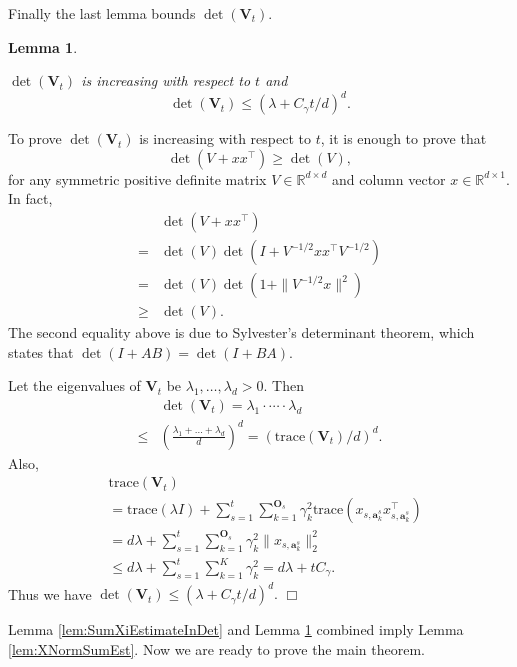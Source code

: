 \documentclass{article}
\newcommand{\RR}{\mathbb{R}}
\newcommand{\ba}{\mathbf{a}}
\newcommand{\bO}{\mathbf{O}}
\newcommand{\bV}{\mathbf{V}}
\newcommand{\trace}{\mathrm{trace}}
\newcommand{\norm}[1]{\| #1 \|}
\newtheorem{lemma}[theorem]{Lemma}%
\newenvironment{proof}{\noindent {\textbf{Proof. }}}{$\Box$ \medskip}
\newcommand{\CLemmaDetVt}{
  $\det(\bV_t)$ is increasing with respect to $t$ and 
  $$
    \det(\bV_t) \leq (\lambda + C_\gamma t/d)^d.
  $$
}
\begin{document}
Finally the last lemma bounds $\det(\bV_t)$.

\begin{lemma} %
	\label{lem:detVt}
	\CLemmaDetVt
\end{lemma}
\begin{proof}
	To prove $\det(\bV_t)$ is increasing with respect to $t$, it is enough to prove that
	$$
	\det(V + xx^{\top}) \geq \det(V),
	$$
	for any symmetric positive definite matrix $V \in \RR^{d \times d}$ and column vector $x \in \RR^{d\times 1}$. In fact,
	\begin{align*}
	&\det(V + xx^{\top}) \\
	=& \det(V) \det(I + V^{-1/2}x x^{\top} V^{-1/2})\\
	=& \det(V) \det(1 + \norm{V^{-1/2}x}^2)\\
	\geq &\det(V).
	\end{align*}
	The second equality above is due to Sylvester's determinant theorem, which states that $\det(I + AB) = \det(I +BA)$.
	
	Let the eigenvalues of $\bV_t$ be $\lambda_1, \ldots, \lambda_d > 0$. Then
	\begin{align*}
	&\det(\bV_t) = \lambda_1 \cdot \cdots \cdot \lambda_d \\
	\leq & \left( \frac{\lambda_1 + \ldots + \lambda_d}{d} \right)^d = (\trace(\bV_t)/d)^d.
	\end{align*}
	Also,
	\begin{align*}
	&\trace(\bV_t)\\
	& = \trace(\lambda I) + \sum_{s=1}^t \sum_{k=1}^{\bO_s} \gamma_k^2 \trace(x_{s,\ba_k^s} x_{s,\ba_k^s}^{\top})\\	
	& = d \lambda + \sum_{s=1}^t \sum_{k=1}^{\bO_s} \gamma_k^2 \norm{x_{s,\ba_k^s}}_2^2\\
	& \leq d \lambda + \sum_{s=1}^t\sum_{k=1}^{K}\gamma_k^2 = d \lambda + t C_\gamma.
	\end{align*}
	Thus we have $\det(\bV_t) \leq (\lambda + C_\gamma t/d)^d.$
\end{proof}

Lemma \ref{lem:SumXiEstimateInDet} and Lemma \ref{lem:detVt} combined imply Lemma \ref{lem:XNormSumEst}. Now we are ready to prove the main theorem.
\end{document}
